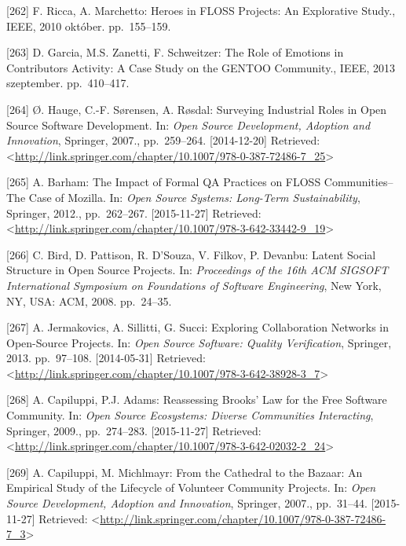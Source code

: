 \documentclass[12pt,magyar,a4paper,oneside]{scrreprt}
\begin{document}
\leavevmode\hypertarget{ref-ricca_heroes_2010}{}%
{[}262{]} F. Ricca, A. Marchetto: Heroes in FLOSS Projects: An
Explorative Study., IEEE, 2010 október. pp.~155--159.

\leavevmode\hypertarget{ref-garcia_role_2013}{}%
{[}263{]} D. Garcia, M.S. Zanetti, F. Schweitzer: The Role of Emotions
in Contributors Activity: A Case Study on the GENTOO Community., IEEE,
2013 szeptember. pp.~410--417.

\leavevmode\hypertarget{ref-hauge_surveying_2007}{}%
{[}264{]} Ø. Hauge, C.-F. Sørensen, A. Røsdal: Surveying Industrial
Roles in Open Source Software Development. In: \emph{Open Source
Development, Adoption and Innovation}, Springer, 2007., pp.~259--264.
{[}2014-12-20{]} Retrieved:
\textless{}\url{http://link.springer.com/chapter/10.1007/978-0-387-72486-7_25}\textgreater{}

\leavevmode\hypertarget{ref-barham_impact_2012}{}%
{[}265{]} A. Barham: The Impact of Formal QA Practices on FLOSS
Communities--The Case of Mozilla. In: \emph{Open Source Systems:
Long-Term Sustainability}, Springer, 2012., pp.~262--267.
{[}2015-11-27{]} Retrieved:
\textless{}\url{http://link.springer.com/chapter/10.1007/978-3-642-33442-9_19}\textgreater{}

\leavevmode\hypertarget{ref-bird_latent_2008}{}%
{[}266{]} C. Bird, D. Pattison, R. D'Souza, V. Filkov, P. Devanbu:
Latent Social Structure in Open Source Projects. In: \emph{Proceedings
of the 16th ACM SIGSOFT International Symposium on Foundations of
Software Engineering}, New York, NY, USA: ACM, 2008. pp.~24--35.

\leavevmode\hypertarget{ref-jermakovics_exploring_2013}{}%
{[}267{]} A. Jermakovics, A. Sillitti, G. Succi: Exploring Collaboration
Networks in Open-Source Projects. In: \emph{Open Source Software:
Quality Verification}, Springer, 2013. pp.~97--108. {[}2014-05-31{]}
Retrieved:
\textless{}\url{http://link.springer.com/chapter/10.1007/978-3-642-38928-3_7}\textgreater{}

\leavevmode\hypertarget{ref-capiluppi_reassessing_2009}{}%
{[}268{]} A. Capiluppi, P.J. Adams: Reassessing Brooks' Law for the Free
Software Community. In: \emph{Open Source Ecosystems: Diverse
Communities Interacting}, Springer, 2009., pp.~274--283.
{[}2015-11-27{]} Retrieved:
\textless{}\url{http://link.springer.com/chapter/10.1007/978-3-642-02032-2_24}\textgreater{}

\leavevmode\hypertarget{ref-capiluppi_cathedral_2007}{}%
{[}269{]} A. Capiluppi, M. Michlmayr: From the Cathedral to the Bazaar:
An Empirical Study of the Lifecycle of Volunteer Community Projects. In:
\emph{Open Source Development, Adoption and Innovation}, Springer,
2007., pp.~31--44. {[}2015-11-27{]} Retrieved:
\textless{}\url{http://link.springer.com/chapter/10.1007/978-0-387-72486-7_3}\textgreater{}
\end{document}

